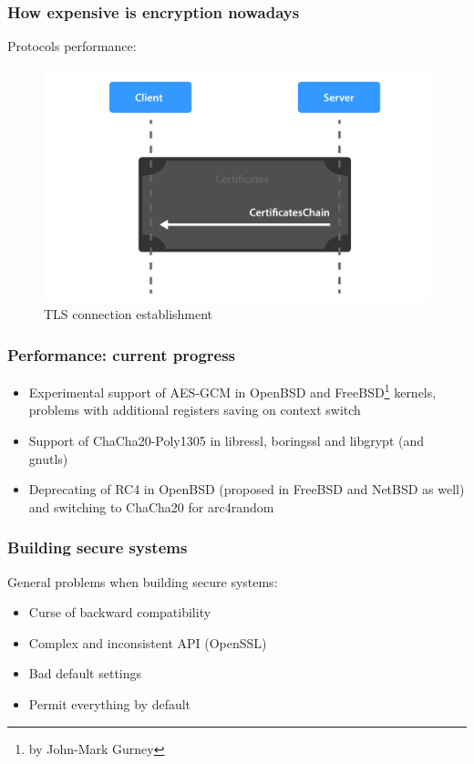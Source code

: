 \documentclass[11pt,t]{beamer}
\newcommand{\funcname}[1]{
	{\color{yellow!30} #1}
}
\newcommand{\cipher}[1]{
	{\color{blue!30} #1}
}
\begin{document}
\begin{frame}[fragile]
\frametitle{How expensive is encryption nowadays}
Protocols performance:
\begin{figure}[H]
\centering
\includegraphics[height=0.6\textheight]{tls.pdf}
\caption{TLS connection establishment}
\end{figure}
\end{frame}

\begin{frame}
\frametitle{Performance: current progress}
\begin{itemize}
\item<1-> Experimental support of \cipher{AES-GCM} in OpenBSD and FreeBSD\footnote{by John-Mark 
Gurney} kernels, problems with additional registers saving on context switch
\item<2-> Support of \cipher{ChaCha20-Poly1305} in libressl, boringssl and libgrypt (and 
gnutls)
\item<3-> Deprecating of \cipher{RC4} in OpenBSD (proposed in FreeBSD and NetBSD as well) and switching to ChaCha20 for \funcname{arc4random}
\end{itemize}
\end{frame}

\begin{frame}
\frametitle{Building secure systems}
General problems when building secure systems:
\begin{itemize}
\item<1-> Curse of backward compatibility
\item<2-> Complex and inconsistent API (OpenSSL)
\item<3-> Bad default settings
\item<3-> Permit everything by default
\end{itemize}
\end{frame}
\end{document}
